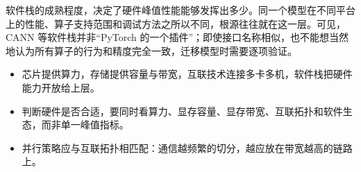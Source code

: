 软件栈的成熟程度，决定了硬件峰值性能能够发挥出多少。同一个模型在不同平台上的性能、算子支持范围和调试方法之所以不同，根源往往就在这一层。可见，CANN 等软件栈并非“PyTorch 的一个插件”；即使接口名称相似，也不能想当然地认为所有算子的行为和精度完全一致，迁移模型时需要逐项验证。

\begin{keypoints}
\begin{itemize}[leftmargin=1.5em]
  \item 芯片提供算力，存储提供容量与带宽，互联技术连接多卡多机，软件栈把硬件能力开放给上层。
  \item 判断硬件是否合适，要同时看算力、显存容量、显存带宽、互联拓扑和软件生态，而非单一峰值指标。
  \item 并行策略应与互联拓扑相匹配：通信越频繁的切分，越应放在带宽越高的链路上。
\end{itemize}
\end{keypoints}
